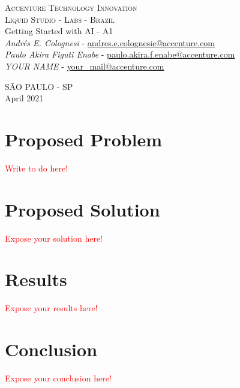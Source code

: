 \documentclass[12pt]{article}
\begin{document}
\begin{titlepage}
\begin{center}
\textsc{ \Large Accenture Technology Innovation}\\ [1.0cm]
\textsc{ \large Liquid Studio - Labs - Brazil}\\[5.5cm]
{ \huge Getting Started with AI - A1} \\[2.0cm]
\emph{Andrés E. Colognesi} - \href{mailto:andres.e.colognesi@accenture.com}{andres.e.colognesie@accenture.com} \\
\emph{Paulo Akira Figuti Enabe} - \href{mailto:paulo.akira.f.enabe@accenture.com}{paulo.akira.f.enabe@accenture.com}
\\[1.0cm]
\emph{YOUR NAME} - \href{mailto:your\_mail@accenture.com}{your\_mail@accenture.com}

\vfill{
\large \uppercase{São Paulo - SP}\\[0.5cm]
April 2021
}

\end{center}
\end{titlepage}

\newpage

\tableofcontents

\newpage

\section{Proposed Problem}

\textcolor{red}{Write to do here!}

\bigbreak


\section{Proposed Solution}

\textcolor{red}{Expose your solution here!}

\bigbreak


\section{Results}

\textcolor{red}{Expose your results here!}

\bigbreak


\section{Conclusion}

\textcolor{red}{Expose your conclusion here!}

\newpage





\end{document}
